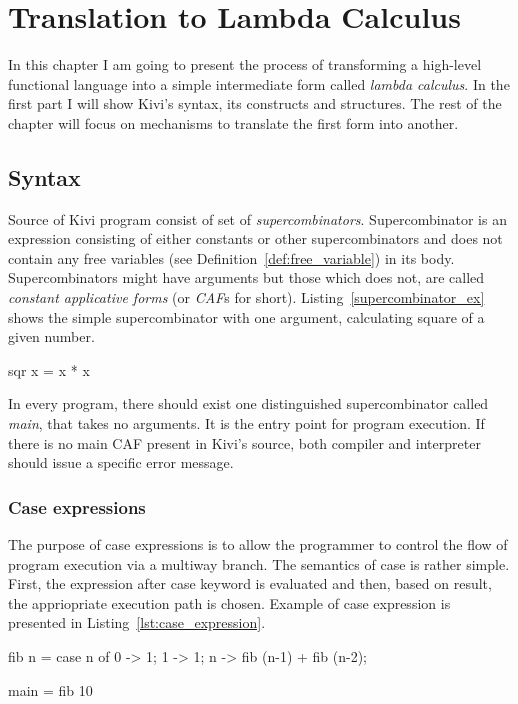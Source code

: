 \documentclass[12pt,a4paper]{report}
\begin{document}
\chapter{Translation to Lambda Calculus}

In this chapter I am going to present the process of transforming a high-level
functional language into a simple intermediate form called \textit{lambda
calculus}. In the first part I will show Kivi's syntax, its constructs and
structures. The rest of the chapter will focus on mechanisms to translate the
first form into another.

\section{Syntax}
Source of Kivi program consist of set of
\textit{supercombinators}\cite{wiki:supercombinator}. Supercombinator is an
expression consisting of either constants or other supercombinators and does
not contain any free variables (see Definition~\ref{def:free_variable}) in its
body. Supercombinators might have arguments but those which does not, are
called \textit{constant applicative forms} (or \textit{CAF}s for short).
Listing~\ref{supercombinator_ex} shows the simple supercombinator with one
argument, calculating square of a given number.

\vspace*{0.2in}
\begin{code}[style=haskell,label=supercombinator_ex,caption={Simple supercombinator.}]
  sqr x = x * x
\end{code}

In every program, there should exist one distinguished supercombinator called
\textit{main}, that takes no arguments. It is the entry point for program
execution. If there is no main CAF present in Kivi's source, both compiler and
interpreter should issue a specific error message.

\subsection{Case expressions}
The purpose of case expressions is to allow the programmer to control the flow
of program execution via a multiway branch. The semantics of case is rather
simple. First, the expression after case keyword is evaluated and then, based
on result, the appriopriate execution path is chosen. Example of case
expression is presented in Listing~\ref{lst:case_expression}.

\vspace*{0.2in}
\begin{code}[style=haskell,label=lst:case_expression,caption={Fibonacci with case}]
  fib n =
      case n of
          0 -> 1;
          1 -> 1;
          n -> fib (n-1) + fib (n-2);

  main = fib 10
\end{code}
\end{document}
